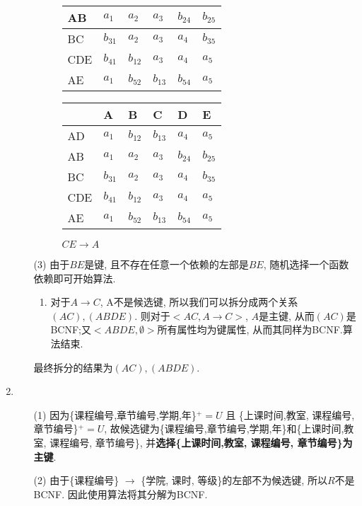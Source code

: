 \documentclass[10pt, a4paper]{article}
\begin{document}
\begin{enumerate}
\begin{enumerate}
\begin{figure}[H]
\begin{minipage}[b]{0.5\linewidth}
\begin{tabular}{|l|l|l|l|l|l|}
						AB  & $a_1$ & $a_2$  & $a_3$  & $b_{24}$ & $b_{25}$  \\ \hline
						BC  & $b_{31}$ &  $a_2$ & $a_3$ & $a_4$ & $b_{35}$ \\ \hline
						CDE & $b_{41}$ & $b_{12}$ & $a_3$ & $a_4$ & $a_5$ \\ \hline
						AE  & $a_1$ & $b_{52}$ & $b_{13}$ & $b_{54}$ & $a_5$ \\ \hline
						\end{tabular}
						\caption{$DE\to C$}\label{tab:5}
				\end{minipage}
				\begin{minipage}[b]{0.5\linewidth}
					\centering
					\begin{tabular}{|l|l|l|l|l|l|}
						\hline
							& A & B & C & D & E \\ \hline
						AD  & $a_1$ & $b_{12}$ & $b_{13}$  & $a_4$  & $a_5$  \\ \hline
						AB  & $a_1$ & $a_2$  & $a_3$  & $b_{24}$ & $b_{25}$  \\ \hline
						BC  & $b_{31}$ &  $a_2$ & $a_3$ & $a_4$ & $b_{35}$ \\ \hline
						CDE & $b_{41}$ & $b_{12}$ & $a_3$ & $a_4$ & $a_5$ \\ \hline
						AE  & $a_1$ & $b_{52}$ & $b_{13}$ & $b_{54}$ & $a_5$ \\ \hline
						\end{tabular}
						\caption{$CE\to A$}\label{tab:6}
				\end{minipage}
			\end{figure}
			\item[(3)] 由于$BE$是键, 且不存在任意一个依赖的左部是$BE$, 随机选择一个函数依赖即可开始算法.
			\begin{enumerate}
				\item 对于$A\to C$, A不是候选键, 所以我们可以拆分成两个关系$(AC), (ABDE)$. 则对于$<{AC}, {A\to C}>$, $A$是主键, 从而$(AC)$是BCNF;又$<{ABDE}, \emptyset>$所有属性均为键属性, 从而其同样为BCNF.算法结束.
			\end{enumerate} 
			最终拆分的结果为$(AC), (ABDE)$.
		\end{enumerate}
		\item \begin{enumerate}
			\item[(1)] 因为\{课程编号,章节编号,学期,年\}$^+ = U$ 且 \{上课时间,教室, 课程编号, 章节编号\}$^+ = U$, 故候选键为\{课程编号,章节编号,学期,年\}和\{上课时间,教室, 课程编号, 章节编号\}, 并\textbf{选择\{上课时间,教室, 课程编号, 章节编号\}为主键}.
			\item[(2)] 由于\{课程编号\} $\to$ \{学院, 课时, 等级\}的左部不为候选键, 所以$R$不是BCNF. 因此使用算法将其分解为BCNF.

\end{enumerate}
\end{enumerate}
\end{document}
